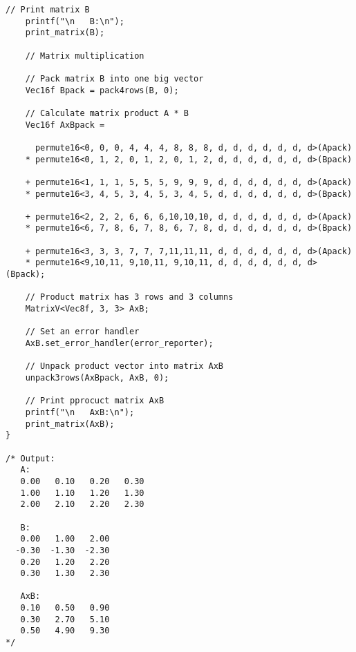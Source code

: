 \documentclass[11pt,a4paper,oneside,openright]{report}
\newcommand{\vspacebig}{\vspace{6mm}}
\begin{document}
\begin{lstlisting}[frame=none]
    // Print matrix B
    printf("\n   B:\n");
    print_matrix(B);

    // Matrix multiplication

    // Pack matrix B into one big vector
    Vec16f Bpack = pack4rows(B, 0);

    // Calculate matrix product A * B
    Vec16f AxBpack =
    
      permute16<0, 0, 0, 4, 4, 4, 8, 8, 8, d, d, d, d, d, d, d>(Apack)
    * permute16<0, 1, 2, 0, 1, 2, 0, 1, 2, d, d, d, d, d, d, d>(Bpack)

    + permute16<1, 1, 1, 5, 5, 5, 9, 9, 9, d, d, d, d, d, d, d>(Apack)
    * permute16<3, 4, 5, 3, 4, 5, 3, 4, 5, d, d, d, d, d, d, d>(Bpack)

    + permute16<2, 2, 2, 6, 6, 6,10,10,10, d, d, d, d, d, d, d>(Apack)
    * permute16<6, 7, 8, 6, 7, 8, 6, 7, 8, d, d, d, d, d, d, d>(Bpack)

    + permute16<3, 3, 3, 7, 7, 7,11,11,11, d, d, d, d, d, d, d>(Apack)
    * permute16<9,10,11, 9,10,11, 9,10,11, d, d, d, d, d, d, d>(Bpack);

    // Product matrix has 3 rows and 3 columns
    MatrixV<Vec8f, 3, 3> AxB;

    // Set an error handler
    AxB.set_error_handler(error_reporter);

    // Unpack product vector into matrix AxB
    unpack3rows(AxBpack, AxB, 0);

    // Print pprocuct matrix AxB
    printf("\n   AxB:\n");
    print_matrix(AxB);
}

/* Output:
   A:
   0.00   0.10   0.20   0.30
   1.00   1.10   1.20   1.30
   2.00   2.10   2.20   2.30

   B:
   0.00   1.00   2.00
  -0.30  -1.30  -2.30
   0.20   1.20   2.20
   0.30   1.30   2.30

   AxB:
   0.10   0.50   0.90
   0.30   2.70   5.10
   0.50   4.90   9.30
*/
\end{lstlisting}
\vspacebig
\end{document}
